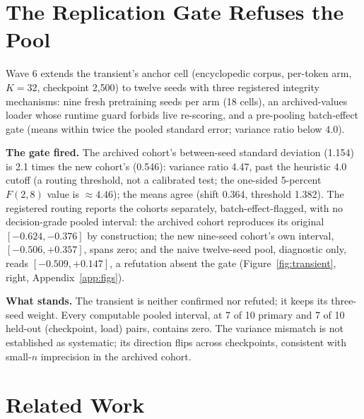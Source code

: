 \documentclass{article} %
\begin{document}
\section{The Replication Gate Refuses the Pool}
\label{sec:replication}

Wave 6 extends the transient's anchor cell (encyclopedic corpus, per-token
arm, $K{=}32$, checkpoint 2{,}500) to twelve seeds with three registered
integrity mechanisms: nine fresh pretraining seeds per arm (18 cells), an
archived-values loader whose runtime guard forbids live re-scoring,
and a pre-pooling batch-effect gate (means within twice the pooled
standard error; variance ratio below 4.0).

\textbf{The gate fired.} The archived cohort's between-seed standard
deviation (1.154) is 2.1 times the new cohort's (0.546): variance ratio
4.47, past the heuristic 4.0 cutoff (a routing threshold, not a calibrated
test; the one-sided 5-percent $F(2,8)$ value is ${\approx}4.46$); the
means agree (shift 0.364, threshold 1.382). %
The registered routing reports the cohorts separately, batch-effect-flagged,
with no decision-grade pooled interval: the archived cohort reproduces its
original $[-0.624, -0.376]$ by construction; the new nine-seed cohort's own
interval, $[-0.506, +0.357]$, spans zero; %
and the naive twelve-seed pool, diagnostic only, reads $[-0.509, +0.147]$,
a refutation absent the gate %
(Figure~\ref{fig:transient}, right, Appendix~\ref{app:figs}).

\textbf{What stands.} The transient is neither confirmed nor refuted; it
keeps its three-seed weight. Every computable pooled interval, at 7 of 10
primary and 7 of 10 held-out (checkpoint, load) pairs, contains zero.
The variance mismatch is not established as systematic; its direction
flips across checkpoints, consistent with small-$n$ imprecision in the
archived cohort.

\section{Related Work}
\label{sec:related}
\end{document}
